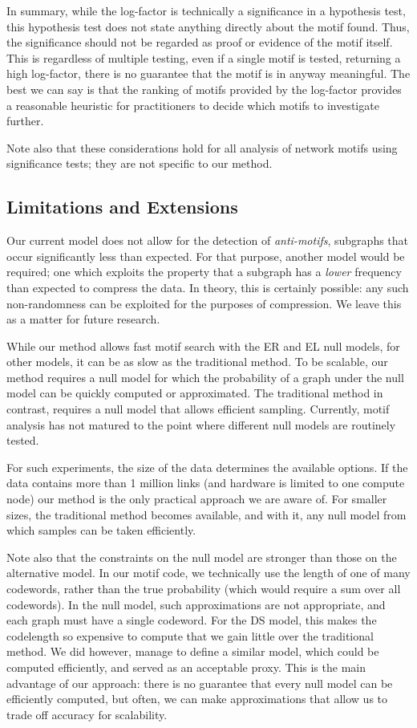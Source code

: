 \documentclass[twoside,11pt]{article}
\begin{document}
In summary, while the log-factor is technically a significance in a hypothesis test, this hypothesis test does not state anything directly about the motif found. Thus, the significance should not be regarded as proof or evidence of the motif itself. This is regardless of multiple testing, even if a single motif is tested, returning a high log-factor, there is no guarantee that the motif is in anyway meaningful. The best we can say is that the ranking of motifs provided by the log-factor provides a reasonable heuristic for practitioners to decide which motifs to investigate further.

Note also that these considerations hold for all analysis of network motifs using significance tests; they are not specific to our method.

\subsection{Limitations and Extensions}

Our current model does not allow for the detection of \emph{anti-motifs}, subgraphs that occur significantly less than expected. For that purpose, another model would be required; one which exploits the property that a subgraph has a \emph{lower} frequency than expected to compress the data. In theory, this is certainly possible: any such non-randomness can be exploited for the purposes of compression. We leave this as a matter for future research.

While our method allows fast motif search with the ER and EL null models, for other models, it can be as slow as the traditional method. To be scalable, our method requires a null model for which the probability of a graph under the null model can be quickly computed or approximated. The traditional method in contrast, requires a null model that allows efficient sampling. Currently, motif analysis has not matured to the point where different null models are routinely tested.

For such experiments, the size of the data determines the available options. If the data contains more than 1 million links (and hardware is limited to one compute node) our method is the only practical approach we are aware of. For smaller sizes, the traditional method becomes available, and with it, any null model from which samples can be taken efficiently. 

Note also that the constraints on the null model are stronger than those on the alternative model. In our motif code, we technically use the length of one of many codewords, rather than the true probability (which would require a sum over all codewords). In the null model, such approximations are not appropriate, and each graph must have a single codeword. For the DS model, this makes the codelength so expensive to compute that we gain little over the traditional method. We did however, manage to define a similar model, which could be computed efficiently, and served as an acceptable proxy. This is the main advantage of our approach: there is no guarantee that every null model can be efficiently computed, but often, we can make approximations that allow us to trade off accuracy for scalability.
\end{document}
